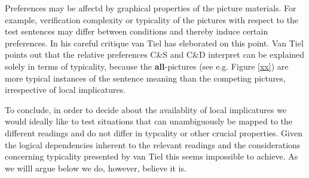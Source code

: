 \documentclass[a4paper,10pt]{article}
\begin{document}
Preferences may be affectd by graphical properties of the picture materials. For example, verification complexity or typicality of the pictures with respect to the test sentences may differ between conditions and thereby induce certain preferences. In his careful critique van Tiel has eleborated on this point. Van Tiel points out that the relative preferences C\&S and C\&D interpret can be explained solely in terms of typicality, because the {\bf all}-pictures (see e.g. Figure \ref{xx}) are more typical instances of the sentence meaning than the competing pictures, irrespective of local implicatures.

To conclude, in order to decide about the availablity of local implicatures we would ideally like to test situations that can unambiguously be mapped to the different readings and do not differ in typcality or other crucial properties. Given the logical dependencies inherent to the relevant readings and the considerations concerning typicality presented by van Tiel this seems impossible to achieve. As we willl argue below we do, however, believe it is.      




\end{document}
